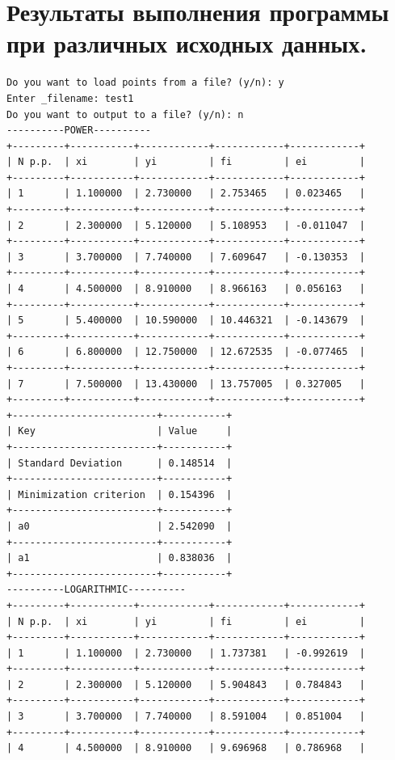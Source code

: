 \documentclass[12pt,one column]{article}
\begin{document}
\section{Результаты выполнения программы при различных исходных данных.}
\begin{verbatim}
Do you want to load points from a file? (y/n): y
Enter _filename: test1
Do you want to output to a file? (y/n): n
----------POWER----------
+---------+-----------+------------+------------+------------+
| N p.p.  | xi        | yi         | fi         | ei         | 
+---------+-----------+------------+------------+------------+
| 1       | 1.100000  | 2.730000   | 2.753465   | 0.023465   | 
+---------+-----------+------------+------------+------------+
| 2       | 2.300000  | 5.120000   | 5.108953   | -0.011047  | 
+---------+-----------+------------+------------+------------+
| 3       | 3.700000  | 7.740000   | 7.609647   | -0.130353  | 
+---------+-----------+------------+------------+------------+
| 4       | 4.500000  | 8.910000   | 8.966163   | 0.056163   | 
+---------+-----------+------------+------------+------------+
| 5       | 5.400000  | 10.590000  | 10.446321  | -0.143679  | 
+---------+-----------+------------+------------+------------+
| 6       | 6.800000  | 12.750000  | 12.672535  | -0.077465  | 
+---------+-----------+------------+------------+------------+
| 7       | 7.500000  | 13.430000  | 13.757005  | 0.327005   | 
+---------+-----------+------------+------------+------------+
+-------------------------+-----------+
| Key                     | Value     | 
+-------------------------+-----------+
| Standard Deviation      | 0.148514  | 
+-------------------------+-----------+
| Minimization criterion  | 0.154396  | 
+-------------------------+-----------+
| a0                      | 2.542090  | 
+-------------------------+-----------+
| a1                      | 0.838036  | 
+-------------------------+-----------+
----------LOGARITHMIC----------
+---------+-----------+------------+------------+------------+
| N p.p.  | xi        | yi         | fi         | ei         | 
+---------+-----------+------------+------------+------------+
| 1       | 1.100000  | 2.730000   | 1.737381   | -0.992619  | 
+---------+-----------+------------+------------+------------+
| 2       | 2.300000  | 5.120000   | 5.904843   | 0.784843   | 
+---------+-----------+------------+------------+------------+
| 3       | 3.700000  | 7.740000   | 8.591004   | 0.851004   | 
+---------+-----------+------------+------------+------------+
| 4       | 4.500000  | 8.910000   | 9.696968   | 0.786968   | 

\end{verbatim}
\end{document}
